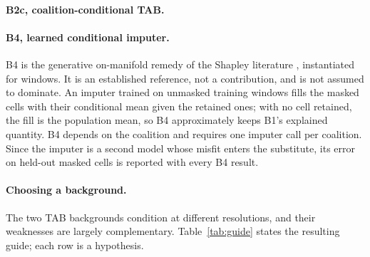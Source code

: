 \documentclass{article}
\begin{document}
\paragraph{B2c, coalition-conditional TAB.} 

\paragraph{B4, learned conditional imputer.} B4 is the generative on-manifold remedy of the Shapley literature \citep{frye2021shapley}, instantiated for windows. It is an established reference, not a contribution, and is not assumed to dominate. An imputer trained on unmasked training windows fills the masked cells with their conditional mean given the retained ones; with no cell retained, the fill is the population mean, so B4 approximately keeps B1's explained quantity. B4 depends on the coalition and requires one imputer call per coalition. Since the imputer is a second model whose misfit enters the substitute, its error on held-out masked cells is reported with every B4 result.

\paragraph{Choosing a background.} The two TAB backgrounds condition at different resolutions, and their weaknesses are largely complementary. Table~\ref{tab:guide} states the resulting guide; each row is a hypothesis.
\end{document}
